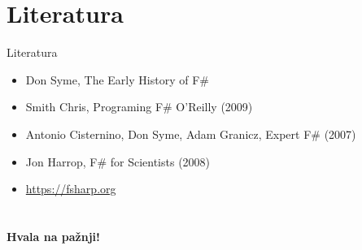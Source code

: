 \documentclass{beamer}
\begin{document}
\section{Literatura}

\begin{frame}{Literatura}
 \begin{itemize}
	\item Don Syme, The Early History of F\# 	
  	\item Smith Chris, Programing F\# O’Reilly (2009)
  	\item Antonio Cisternino, Don Syme, Adam Granicz, Expert F\# (2007)
  	\item Jon Harrop, F\# for Scientists (2008)
  	\item \href{https://fsharp.org}{https://fsharp.org}
  \end{itemize}
 
\end{frame}

\section{}
\begin{frame}{}
 \begin{center}
 	\textbf {Hvala na pažnji!}
 \end{center}
\end{frame}
\end{document}
